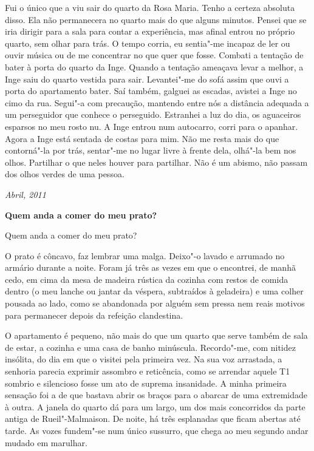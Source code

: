 Fui o único que a viu sair do quarto da Rosa Maria. Tenho a certeza
absoluta disso. Ela não permanecera no quarto mais do que alguns
minutos. Pensei que se iria dirigir para a sala para contar a
experiência, mas afinal entrou no próprio quarto, sem olhar para trás. O
tempo corria, eu sentia"-me incapaz de ler ou ouvir música ou de me
concentrar no que quer que fosse. Combati a tentação de bater à porta do
quarto da Inge. Quando a tentação ameaçava levar a melhor, a Inge saiu
do quarto vestida para sair. Levantei"-me do sofá assim que ouvi a porta
do apartamento bater. Saí também, galguei as escadas, avistei a Inge no
cimo da rua. Segui"-a com precaução, mantendo entre nós a distância
adequada a um perseguidor
que conhece o perseguido. Estranhei a luz do dia, os aguaceiros
esparsos no meu rosto nu. A Inge entrou num autocarro, corri para o
apanhar. Agora a Inge está sentada de costas para mim. Não me resta mais
do que contorná"-la por trás, sentar"-me no lugar livre à frente dela, olhá"-la bem nos olhos. Partilhar o
que neles houver para partilhar. Não é um abismo, não passam dos olhos
verdes de uma pessoa.

\begin{flushright}
\emph{Abril, 2011}
\end{flushright}
\pagebreak
\thispagestyle{empty}

\movetooddpage\vspace*{1.8cm}
\noindent{}\textbf{Quem anda a comer do meu prato?}
\bigskip

Quem anda a comer do meu prato?

O prato é côncavo, faz lembrar uma malga. Deixo"-o lavado e arrumado no
armário durante a noite. Foram já três as vezes em que o encontrei, de
manhã cedo, em cima da mesa de madeira rústica da cozinha com restos de
comida dentro (o meu lanche ou jantar da véspera, subtraídos à
geladeira) e uma colher pousada ao lado, como se abandonada por alguém
sem pressa nem reais motivos para permanecer depois da refeição
clandestina.

O apartamento é pequeno, não mais do que um quarto que serve também de
sala de estar, a cozinha e uma casa de banho minúscula. Recordo"-me, com
nitidez insólita, do dia em que o visitei pela primeira vez. Na sua voz
arrastada, a senhoria parecia exprimir assombro e reticência, como se
arrendar aquele T1 sombrio e silencioso fosse um ato de suprema insanidade. A minha primeira sensação foi a de que bastava abrir os braços
para o abarcar de uma extremidade à outra. A janela do quarto dá para um
largo, um dos mais concorridos da parte antiga de Rueil"-Malmaison. De
noite, há três esplanadas que ficam abertas até tarde. As vozes
fundem"-se num único sussurro, que chega ao meu segundo andar mudado em marulhar.


